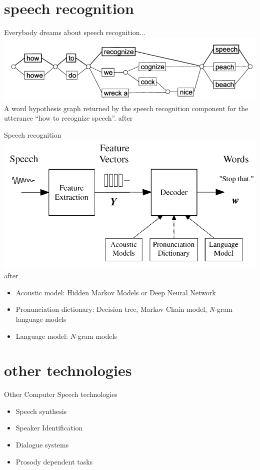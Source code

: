 \section{speech recognition}
\begin{frame}{Everybody dreams about speech recognition...}
\vfill
\pause
\includegraphics[width=\linewidth]{10-speech-recognition}
A word hypothesis graph returned by the speech recognition component for the utterance ``how to recognize speech''. \hfill after \cite[119]{schroeder13}
\end{frame}

\begin{frame}{Speech recognition}
\includegraphics[width=0.95\linewidth]{11-speech-recognition}
after \cite[6]{gales07}\\

\begin{itemize}
\item Acoustic model: Hidden Markov Models or Deep Neural Network
\item Pronunciation dictionary: Decision tree, Markov Chain model, \textit{N}-gram language models
\item Language model: \textit{N}-gram models
\end{itemize}
\end{frame}

\section{other technologies}
\begin{frame}{Other Computer Speech technologies}
\begin{itemize}
\item Speech synthesis
\item Speaker Identification
\item Dialogue systems
\item Prosody dependent tasks
\end{itemize}
\end{frame}

